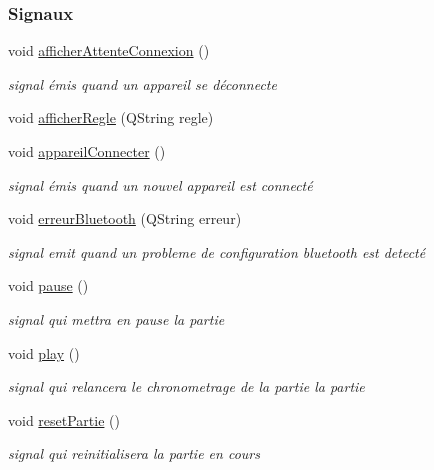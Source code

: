 \subsubsection*{Signaux}
\begin{DoxyCompactItemize}
\item 
void \hyperlink{class_communication_aff862483641966b73aa713b419b819a9}{afficher\+Attente\+Connexion} ()
\begin{DoxyCompactList}\small\item\em signal émis quand un appareil se déconnecte \end{DoxyCompactList}\item 
void \hyperlink{class_communication_a4ee52f9b4a1a97967ab2c48a33e0e392}{afficher\+Regle} (Q\+String regle)
\item 
void \hyperlink{class_communication_ae05ddbb1481cfb64f493940b6db8ed29}{appareil\+Connecter} ()
\begin{DoxyCompactList}\small\item\em signal émis quand un nouvel appareil est connecté \end{DoxyCompactList}\item 
void \hyperlink{class_communication_a9cb85e46b57b6dfa9e71408010bfc0a9}{erreur\+Bluetooth} (Q\+String erreur)
\begin{DoxyCompactList}\small\item\em signal emit quand un probleme de configuration bluetooth est detecté \end{DoxyCompactList}\item 
void \hyperlink{class_communication_a369c7aeadc5c5926eb701bdebe53972c}{pause} ()
\begin{DoxyCompactList}\small\item\em signal qui mettra en pause la partie \end{DoxyCompactList}\item 
void \hyperlink{class_communication_a2645730b88adec069200debe05d212c3}{play} ()
\begin{DoxyCompactList}\small\item\em signal qui relancera le chronometrage de la partie la partie \end{DoxyCompactList}\item 
void \hyperlink{class_communication_af79d126304cca4281db4624b1b457ade}{reset\+Partie} ()
\begin{DoxyCompactList}\small\item\em signal qui reinitialisera la partie en cours \end{DoxyCompactList}\end{DoxyCompactItemize}

